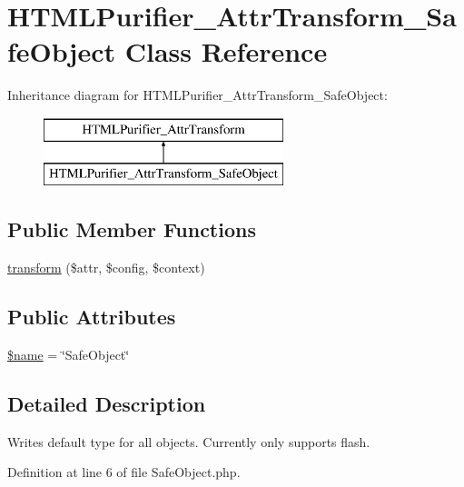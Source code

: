 \hypertarget{classHTMLPurifier__AttrTransform__SafeObject}{\section{H\+T\+M\+L\+Purifier\+\_\+\+Attr\+Transform\+\_\+\+Safe\+Object Class Reference}
\label{classHTMLPurifier__AttrTransform__SafeObject}
}
Inheritance diagram for H\+T\+M\+L\+Purifier\+\_\+\+Attr\+Transform\+\_\+\+Safe\+Object\+:\begin{figure}[H]
\begin{center}
\leavevmode
\includegraphics[height=2.000000cm]{classHTMLPurifier__AttrTransform__SafeObject}
\end{center}
\end{figure}
\subsection*{Public Member Functions}
\begin{DoxyCompactItemize}
\item 
\hyperlink{classHTMLPurifier__AttrTransform__SafeObject_a09b5e5c1063bd0b5b5beab9d3c0fe8e5}{transform} (\$attr, \$config, \$context)
\end{DoxyCompactItemize}
\subsection*{Public Attributes}
\begin{DoxyCompactItemize}
\item 
\hyperlink{classHTMLPurifier__AttrTransform__SafeObject_a8b3f8e56cd67974a72529022fa7b2940}{\$name} = \char`\"{}Safe\+Object\char`\"{}
\end{DoxyCompactItemize}


\subsection{Detailed Description}
Writes default type for all objects. Currently only supports flash. 

Definition at line 6 of file Safe\+Object.\+php.




